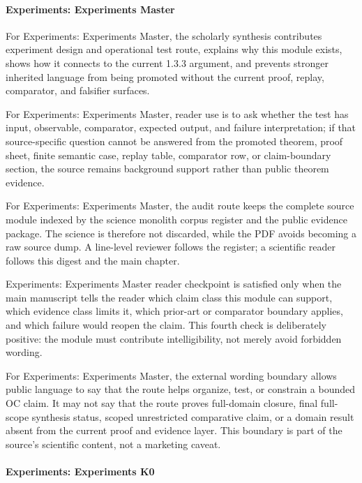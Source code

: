 \paragraph{Experiments: Experiments Master}

For Experiments: Experiments Master, the scholarly synthesis contributes experiment design and operational test route, explains why this module exists, shows how it connects to the current 1.3.3 argument, and prevents stronger inherited language from being promoted without the current proof, replay, comparator, and falsifier surfaces.


For Experiments: Experiments Master, reader use is to ask whether the test has input, observable, comparator, expected output, and failure interpretation; if that source-specific question cannot be answered from the promoted theorem, proof sheet, finite semantic case, replay table, comparator row, or claim-boundary section, the source remains background support rather than public theorem evidence.


For Experiments: Experiments Master, the audit route keeps the complete source module indexed by the science monolith corpus register and the public evidence package. The science is therefore not discarded, while the PDF avoids becoming a raw source dump. A line-level reviewer follows the register; a scientific reader follows this digest and the main chapter.


Experiments: Experiments Master reader checkpoint is satisfied only when the main manuscript tells the reader which claim class this module can support, which evidence class limits it, which prior-art or comparator boundary applies, and which failure would reopen the claim. This fourth check is deliberately positive: the module must contribute intelligibility, not merely avoid forbidden wording.


For Experiments: Experiments Master, the external wording boundary allows public language to say that the route helps organize, test, or constrain a bounded OC claim. It may not say that the route proves full-domain closure, final full-scope synthesis status, scoped unrestricted comparative claim, or a domain result absent from the current proof and evidence layer. This boundary is part of the source's scientific content, not a marketing caveat.


\paragraph{Experiments: Experiments K0}


